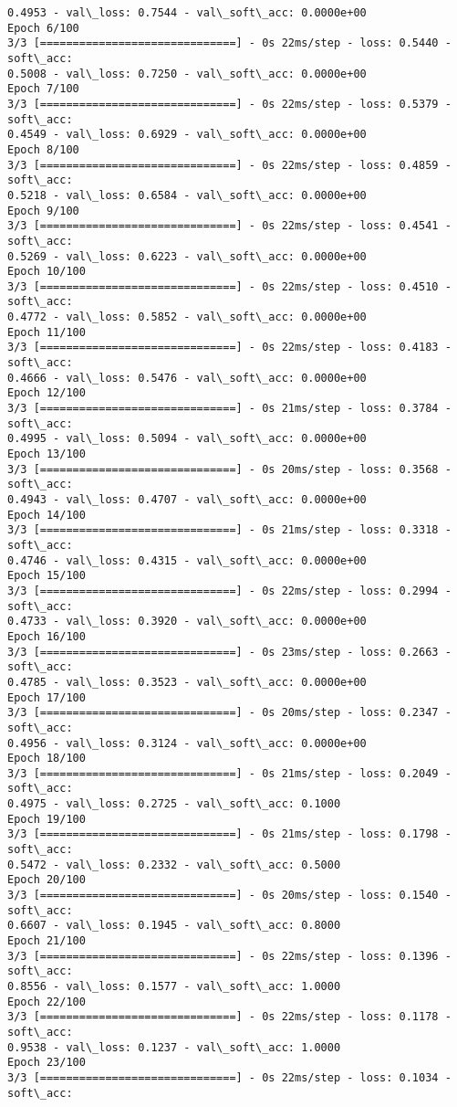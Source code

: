 \documentclass[11pt]{article}
\begin{document}
\begin{Verbatim}[commandchars=\\\{\}]
0.4953 - val\_loss: 0.7544 - val\_soft\_acc: 0.0000e+00
Epoch 6/100
3/3 [==============================] - 0s 22ms/step - loss: 0.5440 - soft\_acc:
0.5008 - val\_loss: 0.7250 - val\_soft\_acc: 0.0000e+00
Epoch 7/100
3/3 [==============================] - 0s 22ms/step - loss: 0.5379 - soft\_acc:
0.4549 - val\_loss: 0.6929 - val\_soft\_acc: 0.0000e+00
Epoch 8/100
3/3 [==============================] - 0s 22ms/step - loss: 0.4859 - soft\_acc:
0.5218 - val\_loss: 0.6584 - val\_soft\_acc: 0.0000e+00
Epoch 9/100
3/3 [==============================] - 0s 22ms/step - loss: 0.4541 - soft\_acc:
0.5269 - val\_loss: 0.6223 - val\_soft\_acc: 0.0000e+00
Epoch 10/100
3/3 [==============================] - 0s 22ms/step - loss: 0.4510 - soft\_acc:
0.4772 - val\_loss: 0.5852 - val\_soft\_acc: 0.0000e+00
Epoch 11/100
3/3 [==============================] - 0s 22ms/step - loss: 0.4183 - soft\_acc:
0.4666 - val\_loss: 0.5476 - val\_soft\_acc: 0.0000e+00
Epoch 12/100
3/3 [==============================] - 0s 21ms/step - loss: 0.3784 - soft\_acc:
0.4995 - val\_loss: 0.5094 - val\_soft\_acc: 0.0000e+00
Epoch 13/100
3/3 [==============================] - 0s 20ms/step - loss: 0.3568 - soft\_acc:
0.4943 - val\_loss: 0.4707 - val\_soft\_acc: 0.0000e+00
Epoch 14/100
3/3 [==============================] - 0s 21ms/step - loss: 0.3318 - soft\_acc:
0.4746 - val\_loss: 0.4315 - val\_soft\_acc: 0.0000e+00
Epoch 15/100
3/3 [==============================] - 0s 22ms/step - loss: 0.2994 - soft\_acc:
0.4733 - val\_loss: 0.3920 - val\_soft\_acc: 0.0000e+00
Epoch 16/100
3/3 [==============================] - 0s 23ms/step - loss: 0.2663 - soft\_acc:
0.4785 - val\_loss: 0.3523 - val\_soft\_acc: 0.0000e+00
Epoch 17/100
3/3 [==============================] - 0s 20ms/step - loss: 0.2347 - soft\_acc:
0.4956 - val\_loss: 0.3124 - val\_soft\_acc: 0.0000e+00
Epoch 18/100
3/3 [==============================] - 0s 21ms/step - loss: 0.2049 - soft\_acc:
0.4975 - val\_loss: 0.2725 - val\_soft\_acc: 0.1000
Epoch 19/100
3/3 [==============================] - 0s 21ms/step - loss: 0.1798 - soft\_acc:
0.5472 - val\_loss: 0.2332 - val\_soft\_acc: 0.5000
Epoch 20/100
3/3 [==============================] - 0s 20ms/step - loss: 0.1540 - soft\_acc:
0.6607 - val\_loss: 0.1945 - val\_soft\_acc: 0.8000
Epoch 21/100
3/3 [==============================] - 0s 22ms/step - loss: 0.1396 - soft\_acc:
0.8556 - val\_loss: 0.1577 - val\_soft\_acc: 1.0000
Epoch 22/100
3/3 [==============================] - 0s 22ms/step - loss: 0.1178 - soft\_acc:
0.9538 - val\_loss: 0.1237 - val\_soft\_acc: 1.0000
Epoch 23/100
3/3 [==============================] - 0s 22ms/step - loss: 0.1034 - soft\_acc:

\end{Verbatim}
\end{document}
